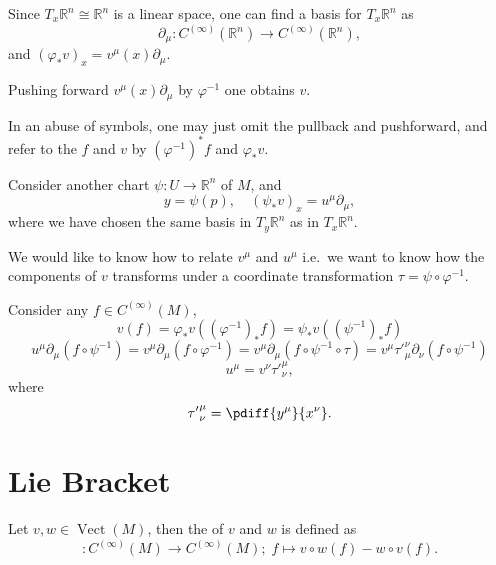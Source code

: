 \documentclass[openany, oneside, a5paper]{book}
\DeclareMathOperator{\Vect}{Vect}
\begin{document}
Since $T_x\mathbb R^n \cong \mathbb R^n$ is a linear space, one can find a basis for $T_x\mathbb R^n$ as
\begin{equation}
    \partial_\mu \colon C^{(\infty)} (\mathbb R^n) \to C^{(\infty)} (\mathbb R^n),
\end{equation}
and $(\varphi_* v)_x = v^\mu (x) \partial_\mu$.

Pushing forward $v^\mu (x) \partial_\mu$ by $\varphi^{-1}$ one obtains $v$.

In an abuse of symbols, one may just omit the pullback and pushforward, and refer to the $f$ and $v$ by $(\varphi^{-1})^* f$ and $\varphi_*v$.

Consider another chart $\psi \colon U \to \mathbb R^n$ of $M$,
and
\begin{equation}
    y = \psi(p),
    \quad
    (\psi_* v)_x = u^\mu \partial_\mu,
\end{equation}
where we have chosen the same basis in $T_y \mathbb R^n$ as in $T_x\mathbb R^n$.

We would like to know how to relate $v^\mu$ and $u^\mu$ i.e.\ we want to know how the components of $v$ transforms under a coordinate transformation $\tau = \psi \circ \varphi^{-1}$.

Consider any $f \in C^{(\infty)}(M)$, 
\begin{equation}
    v(f) = \varphi_* v((\varphi^{-1})_* f)
    = \psi_* v((\psi^{-1})_* f)
\end{equation}
\hence
\begin{equation}
    u^\mu \partial_\mu (f \circ \psi^{-1})
    = v^\mu \partial_\mu (f \circ \varphi^{-1})
    = v^\mu \partial_\mu (f \circ \psi^{-1} \circ \tau)
    = v^\mu {\tau'}^\nu_\mu \partial_\nu (f \circ \psi^{-1})
\end{equation}
\hence
\begin{equation}
    u^\mu = v^\nu {\tau'}^\mu_\nu,
\end{equation}
where
\begin{equation}
    {\tau'}^\mu_\nu = \pdiff{y^\mu}{x^\nu}.
\end{equation}

\section{Lie Bracket}
\begin{definition}
    Let $v, w \in \Vect(M)$, then the  of $v$ and $w$ is defined as
    \begin{equation}
        [v, w] \colon C^{(\infty)}(M) \to C^{(\infty)}(M);
        \;
        f \mapsto v \circ w (f) - w \circ v (f).
    \end{equation}
\end{definition}
\end{document}
